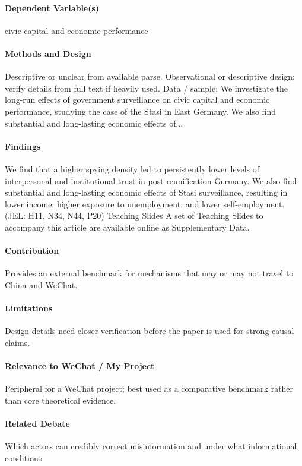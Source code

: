 \documentclass[12pt]{article}
\begin{document}
\paragraph{Dependent Variable(s)} civic capital and economic performance

\paragraph{Methods and Design} Descriptive or unclear from available parse. Observational or descriptive design; verify details from full text if heavily used. Data / sample: We investigate the long-run effects of government surveillance on civic capital and economic performance, studying the case of the Stasi in East Germany. We also find substantial and long-lasting economic effects of...

\paragraph{Findings} We find that a higher spying density led to persistently lower levels of interpersonal and institutional trust in post-reunification Germany. We also find substantial and long-lasting economic effects of Stasi surveillance, resulting in lower income, higher exposure to unemployment, and lower self-employment. (JEL: H11, N34, N44, P20) Teaching Slides A set of Teaching Slides to accompany this article are available online as Supplementary Data.

\paragraph{Contribution} Provides an external benchmark for mechanisms that may or may not travel to China and WeChat.

\paragraph{Limitations} Design details need closer verification before the paper is used for strong causal claims.

\paragraph{Relevance to WeChat / My Project} Peripheral for a WeChat project; best used as a comparative benchmark rather than core theoretical evidence.

\paragraph{Related Debate} Which actors can credibly correct misinformation and under what informational conditions
\end{document}
